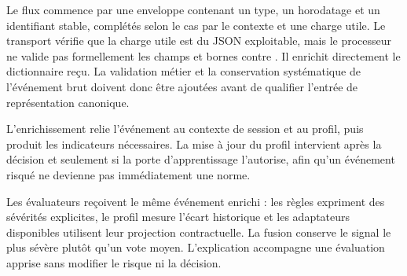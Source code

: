 \documentclass[11pt,a4paper,oneside]{report}
\theoremstyle{definition}
\theoremstyle{plain}
\begin{document}
Le flux commence par une enveloppe contenant un type, un horodatage et un
identifiant stable, complétés selon le cas par le contexte et une charge utile.
Le transport vérifie que la charge utile est du JSON exploitable, mais le
processeur ne valide pas formellement les champs et bornes contre
. Il enrichit directement le dictionnaire
reçu. La validation métier et la conservation systématique de l'événement brut
doivent donc être ajoutées avant de qualifier l'entrée de représentation
canonique.

L'enrichissement relie l'événement au contexte de session et au profil, puis
produit les indicateurs nécessaires. La mise à jour du profil intervient après
la décision et seulement si la porte d'apprentissage l'autorise, afin qu'un
événement risqué ne devienne pas immédiatement une norme.

Les évaluateurs reçoivent le même événement enrichi : les règles expriment des
sévérités explicites, le profil mesure l'écart historique et les adaptateurs
disponibles utilisent leur projection contractuelle. La fusion conserve le
signal le plus sévère plutôt qu'un vote moyen. L'explication accompagne une
évaluation apprise sans modifier le risque ni la décision.
\end{document}
